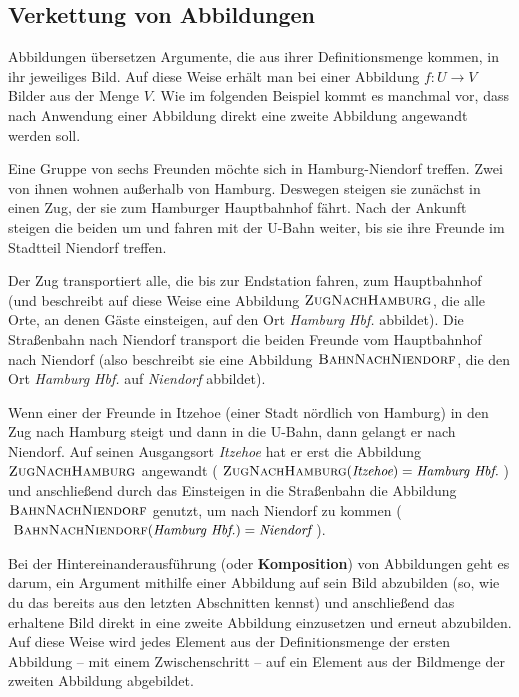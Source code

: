 \documentclass[../../main.tex]{subfiles}
\begin{document}
\subsection{Verkettung von Abbildungen}
\label{sec:abbildungen_verkettung}

Abbildungen übersetzen Argumente, die aus ihrer Definitionsmenge kommen, in ihr jeweiliges Bild. Auf diese Weise erhält man bei einer Abbildung $f\colon U\rightarrow V$ Bilder aus der Menge $V$. Wie im folgenden Beispiel kommt es manchmal vor, dass nach Anwendung einer Abbildung direkt eine zweite Abbildung angewandt werden soll.

\begin{example}{}
    Eine Gruppe von sechs Freunden möchte sich in Hamburg-Niendorf treffen. Zwei von ihnen wohnen außerhalb von Hamburg. Deswegen steigen sie zunächst in einen Zug, der sie zum Hamburger Hauptbahnhof fährt. Nach der Ankunft steigen die beiden um und fahren mit der U-Bahn weiter, bis sie ihre Freunde im Stadtteil Niendorf treffen.
    
    Der Zug transportiert alle, die bis zur Endstation fahren, zum Hauptbahnhof (und beschreibt auf diese Weise eine Abbildung $\textsc{ZugNachHamburg}$, die alle Orte, an denen Gäste einsteigen, auf den Ort \emph{Hamburg Hbf.} abbildet). Die Straßenbahn nach Niendorf transport die beiden Freunde vom Hauptbahnhof nach Niendorf (also beschreibt sie eine Abbildung $\textsc{BahnNachNiendorf}$, die den Ort \emph{Hamburg Hbf.} auf \emph{Niendorf} abbildet).
    
    Wenn einer der Freunde in Itzehoe (einer Stadt nördlich von Hamburg) in den Zug nach Hamburg steigt und dann in die U-Bahn, dann gelangt er nach Niendorf. Auf seinen Ausgangsort \emph{Itzehoe} hat er erst die Abbildung $\textsc{ZugNachHamburg}$ angewandt ($\textsc{ZugNachHamburg}(\emph{Itzehoe})=\emph{Hamburg Hbf.}$) und anschließend durch das Einsteigen in die Straßenbahn die Abbildung $\textsc{BahnNachNiendorf}$ genutzt, um nach Niendorf zu kommen ($\textsc{BahnNachNiendorf}(\emph{Hamburg Hbf.})=\emph{Niendorf}$).
\end{example}

Bei der Hintereinanderausführung (oder \textbf{Komposition}) von Abbildungen geht es darum, ein Argument mithilfe einer Abbildung auf sein Bild abzubilden (so, wie du das bereits aus den letzten Abschnitten kennst) und anschließend das erhaltene Bild direkt in eine zweite Abbildung einzusetzen und erneut abzubilden. Auf diese Weise wird jedes Element aus der Definitionsmenge der ersten Abbildung -- mit einem Zwischenschritt -- auf ein Element aus der Bildmenge der zweiten Abbildung abgebildet.
\end{document}

